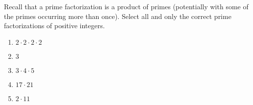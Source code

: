 

Recall that a prime factorization is a product of primes (potentially with some of the primes
occurring more than once).
Select all and only the correct prime factorizations of positive integers.

\begin{enumerate}
    \item $2\cdot 2 \cdot 2 \cdot 2$
    \item $3$
    \item $3 \cdot 4 \cdot 5$
    \item $17 \cdot 21$
    \item $2 \cdot 11$
\end{enumerate}